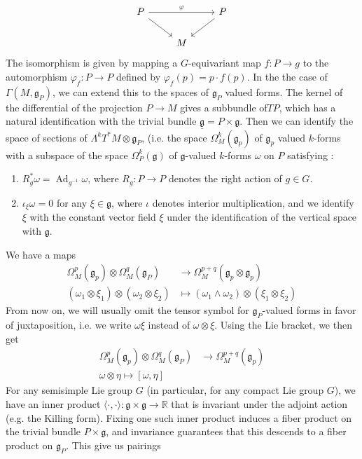 \documentclass[psamsfonts, 12pt]{amsart}
\theoremstyle{definition}
\theoremstyle{remark}
\newcommand{\R}{\mathbb{R}}
\newcommand{\g}{\mathfrak{g}}
\newcommand{\inv}{^{-1}}
\DeclareMathOperator{\Ad}{Ad}
\begin{document}
\[\begin{tikzcd}
P \ar[dr] \ar[rr, "\varphi"] && P \ar[dl] \\
& M
\end{tikzcd}\]
The isomorphism is given by mapping a $G$-equivariant map $f : P \to g$
to the automorphism $\varphi_f : P \to P$ defined by $\varphi_f(p) = p\cdot f(p)$.
%
In the the case of $\Gamma(M,\g_P)$, we can extend this to the spaces of
$\g_P$ valued forms. The kernel of the differential of the projection $P \to M$ gives a
subbundle of$TP$, which has a natural identification with the trivial bundle
$\underline{\g} = P \times \g$. Then we can identify the space of sections of
$\Lambda^kT^*M \otimes \g_P$, (i.e. the space $\Omega^k_M(\g_p)$ of $\g_p$ valued
$k$-forms with a subspace of the space $\Omega^k_P(\g)$ of $\g$-valued $k$-forms $\omega$
on $P$ satisfying :
\begin{enumerate}
  \item $R_g^*\omega = \Ad_{g\inv}\omega$, where $R_g : P \to P$ denotes the right
  action of $g \in G$.
  \item $\iota_\xi\omega = 0$ for any $\xi \in \g$, where $\iota$ denotes interior
  multiplication, and we identify $\xi$ with the constant vector field
  $\xi$ under the identification of the vertical space with $\g$.
\end{enumerate}
%
We have a maps
\begin{align*}
\Omega^p_M(\g_p) \otimes \Omega^q_M(\g_P) &\to \Omega^{p+q}_M(\g_p \otimes \g_p) \\
(\omega_1 \otimes \xi_1) \otimes (\omega_2 \otimes \xi_2)
&\mapsto (\omega_1 \wedge \omega_2) \otimes (\xi_1 \otimes \xi_2)
\end{align*}
From now on, we will usually omit the tensor symbol for $\g_P$-valued forms in favor of
juxtaposition, i.e. we write $\omega\xi$ instead of $\omega \otimes \xi$. Using the Lie
bracket, we then get
\begin{align*}
\Omega^p_M(\g_p) \otimes \Omega^q_M(\g_P) &\to \Omega^{p+q}_M(\g_p) \\
\omega \otimes \eta \mapsto [\omega,\eta]
\end{align*}
For any semisimple Lie group $G$ (in particular, for any compact Lie group $G$), we have
an inner product $\langle\cdot,\cdot\rangle : \g \times \g \to \R$ that is invariant
under the adjoint action (e.g. the Killing form). Fixing one such inner product
induces a fiber product on the trivial bundle $P \times \g$, and invariance
guarantees that this descends to a fiber product on $\g_P$. This give us pairings
\end{document}

